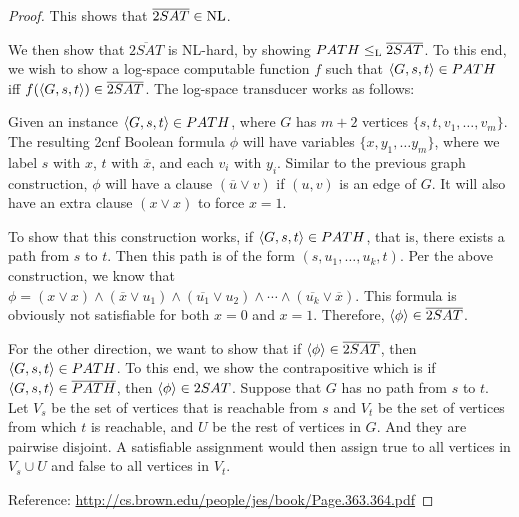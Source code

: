 \begin{mdframed}
\begin{proof}
This shows that $\overline{2SAT} \in \text{NL}$.

\medskip
We then show that $\overline{2SAT}$ is NL-hard, by showing $PATH \leq_{\text{L}} \overline{2SAT}$. To this end, we wish to show a log-space computable function $f$ such that $\langle{G, s, t}\rangle \in PATH$ iff $f(\langle{G, s, t}\rangle) \in \overline{2SAT}$. The log-space transducer works as follows:

Given an instance $\langle{G, s, t}\rangle \in PATH$, where $G$ has $m+2$ vertices $\{s, t, v_1, \ldots, v_m \}$. The resulting 2cnf Boolean formula $\phi$ will have variables $\{x, y_1, \ldots y_m \}$, where we label $s$ with $x$, $t$ with $\overline{x}$, and each $v_i$ with $y_i$. Similar to the previous graph construction, $\phi$ will have a clause $(\overline{u} \vee v)$ if $(u, v)$ is an edge of $G$. It will also have an extra clause $(x \vee x)$ to force $x = 1$.

To show that this construction works, if $\langle{G, s, t}\rangle \in PATH$, that is, there exists a path from $s$ to $t$. Then this path is of the form $(s, u_1, \ldots, u_k, t)$. Per the above construction, we know that $\phi = (x \vee x) \wedge (\overline{x} \vee u_1) \wedge (\overline{u_1} \vee u_2) \wedge \cdots \wedge (\overline{u_k} \vee \overline{x})$. This formula is obviously not satisfiable for both $x = 0$ and $x = 1$. Therefore, $\langle{\phi}\rangle \in \overline{2SAT}$.

For the other direction, we want to show that if $\langle{\phi}\rangle \in \overline{2SAT}$, then $\langle{G, s, t}\rangle \in PATH$. To this end, we show the contrapositive which is if $\langle{G, s, t}\rangle \in \overline{PATH}$, then $\langle{\phi}\rangle \in 2SAT$. Suppose that $G$ has no path from $s$ to $t$. Let $V_s$ be the set of vertices that is reachable from $s$ and $V_t$ be the set of vertices from which $t$ is reachable, and $U$ be the rest of vertices in $G$. And they are pairwise disjoint. A satisfiable assignment would then assign true to all vertices in $V_s \cup U$ and false to all vertices in $V_t$.

Reference: \url{http://cs.brown.edu/people/jes/book/Page.363.364.pdf}
\end{proof}
\end{mdframed}

